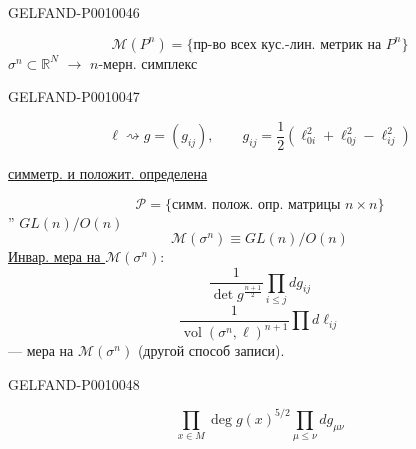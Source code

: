 \begin{GelfandAdjacentEvidence}{GELFAND-P001004}{6}

\begin{equation*}
\mathcal M(P^n)=\{\text{пр-во всех кус.-лин. метрик на }P^n\}\tag{21}
\end{equation*}
$\sigma^n\subset\mathbb R^N$ \(\xrightarrow{\quad}\) $n$-мерн. симплекс

\end{GelfandAdjacentEvidence}
\begin{GelfandAdjacentEvidence}{GELFAND-P001004}{7}


\[
\ell\rightsquigarrow g=(g_{ij}),\qquad
g_{ij}=\frac12(\ell_{0i}^2+\ell_{0j}^2-\ell_{ij}^2)
\]
\begin{flushright}\underline{симметр. и положит. определена}\end{flushright}
\[
\mathcal P=\{\text{симм. полож. опр. матрицы }n\times n\}
\]
'' $GL(n)/O(n)$
\[
\mathcal M(\sigma^n)\equiv GL(n)/O(n)
\]
\underline{Инвар. мера на $\mathcal M(\sigma^n)$}:
\begin{equation*}
\frac{1}{\det g^{\frac{n+1}{2}}}\prod_{i\le j}dg_{ij}\tag{22}
\end{equation*}
\begin{equation*}
\frac{1}{\operatorname{vol}(\sigma^n,\ell)^{n+1}}\prod d\ell_{ij}\tag{23}
\end{equation*}
--- мера на $\mathcal M(\sigma^n)$ (другой способ записи).
\end{GelfandAdjacentEvidence}
\begin{GelfandAdjacentEvidence}{GELFAND-P001004}{8}

\begin{equation*}
\prod_{x\in M}\operatorname{deg}g(x)^{5/2}\prod_{\mu\le\nu}dg_{\mu\nu}\tag{24}
\end{equation*}
\end{GelfandAdjacentEvidence}



